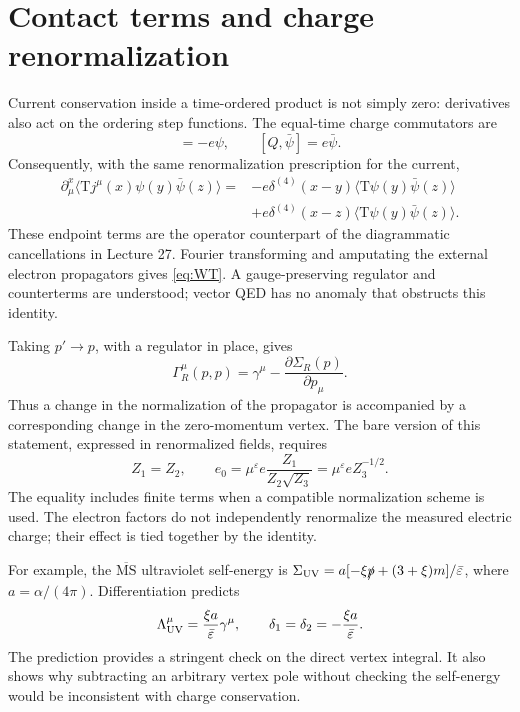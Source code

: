 \documentclass[11pt]{article}
\newcommand{\eps}{\varepsilon}
\newcommand{\Tord}{\mathrm T}
\newcommand{\MSbar}{\overline{\mathrm{MS}}}
\newcommand{\module}[1]{\clearpage\section{#1}}
\begin{document}
\module{Contact terms and charge renormalization}
Current conservation inside a time-ordered product is not simply zero:
derivatives also act on the ordering step functions. The equal-time
charge commutators are
\begin{equation}
 [Q,\psi]=-e\psi,\qquad [Q,\bar\psi]=e\bar\psi.
\end{equation}
Consequently, with the same renormalization prescription for the current,
\begin{align}
 \partial_\mu^x\langle\Tord j^\mu(x)\psi(y)\bar\psi(z)\rangle
 ={}&-e\delta^{(4)}(x-y)\langle\Tord\psi(y)\bar\psi(z)\rangle
 \nonumber\\
 &+e\delta^{(4)}(x-z)\langle\Tord\psi(y)\bar\psi(z)\rangle.
\end{align}
These endpoint terms are the operator counterpart of the diagrammatic
cancellations in Lecture 27. Fourier transforming and amputating the
external electron propagators gives \eqref{eq:WT}. A gauge-preserving
regulator and counterterms are understood; vector QED has no anomaly
that obstructs this identity.

Taking \(p'\to p\), with a regulator in place, gives
\begin{equation}
 \Gamma_R^\mu(p,p)=\gamma^\mu-\frac{\partial\Sigma_R(p)}{\partial p_\mu}.
 \label{eq:wardzero}
\end{equation}
Thus a change in the normalization of the propagator is accompanied by
a corresponding change in the zero-momentum vertex. The bare version
of this statement, expressed in renormalized fields, requires
\begin{equation}
 Z_1=Z_2,\qquad
 e_0=\mu^\eps e\frac{Z_1}{Z_2\sqrt{Z_3}}
     =\mu^\eps eZ_3^{-1/2}.
 \label{eq:Zrelation}
\end{equation}
The equality includes finite terms when a compatible normalization
scheme is used. The electron factors do not independently renormalize
the measured electric charge; their effect is tied together by the identity.

For example, the \(\MSbar\) ultraviolet self-energy is
\(\Sigma_{\rm UV}=a[-\xi\slashed p+(3+\xi)m]/\bar\eps\), where
\(a=\alpha/(4\pi)\). Differentiation predicts
\begin{equation}
 \Lambda^\mu_{\rm UV}=\frac{\xi a}{\bar\eps}\gamma^\mu,
 \qquad \delta_1=\delta_2=-\frac{\xi a}{\bar\eps}.
\end{equation}
The prediction provides a stringent check on the direct vertex integral.
It also shows why subtracting an arbitrary vertex pole without checking
the self-energy would be inconsistent with charge conservation.
\end{document}
